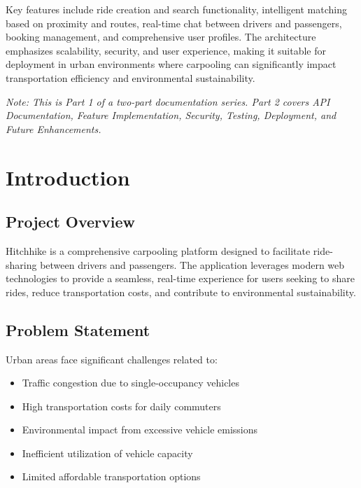 \documentclass[12pt,a4paper]{article}
\begin{document}
Key features include ride creation and search functionality, intelligent matching based on proximity and routes, real-time chat between drivers and passengers, booking management, and comprehensive user profiles. The architecture emphasizes scalability, security, and user experience, making it suitable for deployment in urban environments where carpooling can significantly impact transportation efficiency and environmental sustainability.

\vspace{1cm}

\textit{Note: This is Part 1 of a two-part documentation series. Part 2 covers API Documentation, Feature Implementation, Security, Testing, Deployment, and Future Enhancements.}

\newpage

\section{Introduction}

\subsection{Project Overview}
Hitchhike is a comprehensive carpooling platform designed to facilitate ride-sharing between drivers and passengers. The application leverages modern web technologies to provide a seamless, real-time experience for users seeking to share rides, reduce transportation costs, and contribute to environmental sustainability.

\subsection{Problem Statement}
Urban areas face significant challenges related to:
\begin{itemize}
    \item Traffic congestion due to single-occupancy vehicles
    \item High transportation costs for daily commuters
    \item Environmental impact from excessive vehicle emissions
    \item Inefficient utilization of vehicle capacity
    \item Limited affordable transportation options
\end{itemize}
\end{document}

